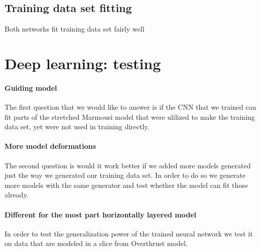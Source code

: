 \documentclass[manuscript]{geophysics}
\begin{document}
\subsection{Training data set fitting}
Both networks fit training data set fairly well


\section{Deep learning: testing}

\paragraph{Guiding model}
The first question that we would like to answer is if the CNN that we trained can fit parts of the stretched Marmousi model that were ulilized to make the training data set, yet were not used in training directly.





\paragraph{More model deformations}
The second question is would it work better if we added more models generated just the way we generated our training data set. In order to do so we generate more models with the same generator and test whether the model can fit those already.


\paragraph{Different for the most part horizontally layered model}
In order to test the generalization power of the trained neural network we test it on data that are modeled in a slice from Overthrust model.
\end{document}
